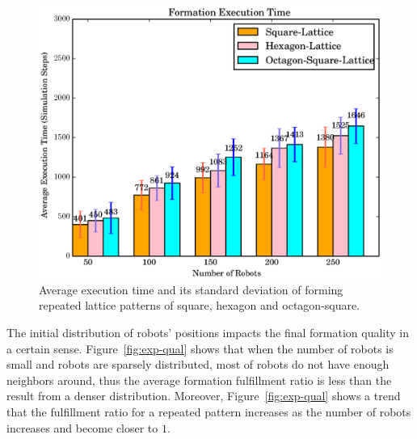 \begin{figure}
    \centering
   \includegraphics[width=\textwidth]{figs/exp_time}
    \caption{Average execution time and its standard deviation of forming repeated lattice patterns of square, hexagon and octagon-square.} 
    \label{fig:exp-time}
\end{figure}

The initial distribution of robots' positions impacts the final formation quality in a certain sense.
%
Figure~\ref{fig:exp-qual} shows that when the number of robots is small and robots are sparsely distributed, most of robots do not have enough neighbors around, thus the average formation fulfillment ratio is less than the result from a denser distribution. 
%
Moreover, Figure~\ref{fig:exp-qual} shows a trend that the fulfillment ratio for
a repeated pattern increases as the number of robots increases and become closer to $1$.

